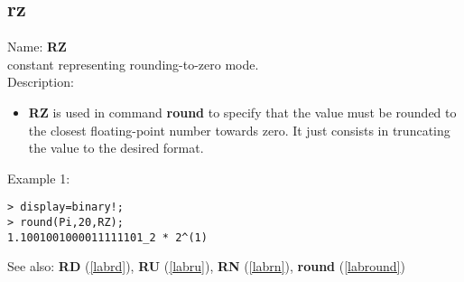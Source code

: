 \subsection{rz}
\label{labrz}
\noindent Name: \textbf{RZ}\\
constant representing rounding-to-zero mode.\\
\noindent Description: \begin{itemize}

\item \textbf{RZ} is used in command \textbf{round} to specify that the value must be rounded
   to the closest floating-point number towards zero. It just consists in 
   truncating the value to the desired format.
\end{itemize}
\noindent Example 1: 
\begin{center}\begin{minipage}{15cm}\begin{Verbatim}[frame=single]
> display=binary!;
> round(Pi,20,RZ);
1.1001001000011111101_2 * 2^(1)
\end{Verbatim}
\end{minipage}\end{center}
See also: \textbf{RD} (\ref{labrd}), \textbf{RU} (\ref{labru}), \textbf{RN} (\ref{labrn}), \textbf{round} (\ref{labround})
